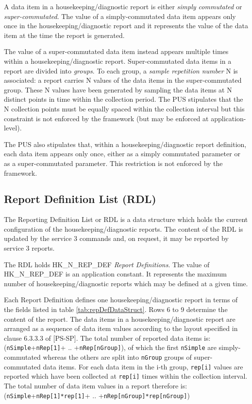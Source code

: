 \documentclass{pnp_article}
\begin{document}
A data item in a housekeeping/diagnostic report is either \textit{simply commutated} or \textit{super-commutated}. The value of a simply-commutated data item appears only once in the housekeeping/diagnostic report and it represents the value of the data item at the time the report is generated.

The value of a super-commutated data item instead appears multiple times within a housekeeping/diagnostic report. Super-commutated data items in a report are divided into \textit{groups}. To each group, a \textit{sample repetition number} N is associated: a report carries N values of the data items in the super-commutated group. These N values have been generated by sampling the data items at N distinct points in time within the collection period. The PUS stipulates that the N collection points must be equally spaced within the collection interval but this constraint is not enforced by the framework (but may be enforced at application-level). 

The PUS also stipulates that, within a housekeeping/diagnostic report definition, each data item appears only once, either as a simply commutated parameter or as a super-commutated parameter. This restriction is not enforced by the framework.

\subsection{Report Definition List (RDL)}\label{sec:serv3RDL}
The Reporting Definition List or RDL is a data structure which holds the current configuration of the housekeeping/diagnostic reports. The content of the RDL is updated by the service 3 commands and, on request, it may be reported by service 3 reports.

The RDL holds HK\_N\_REP\_DEF \textit{Report Definitions}. The value of HK\_N\_REP\_DEF is an application constant. It represents the maximum number of housekeeping/diagnostic reports which may be defined at a given time. 

Each Report Definition defines one housekeeping/diagnostic report in terms of the fields listed in table \ref{tab:repDefDataStruct}. Rows 6 to 9 determine the content of the report. The data items in a housekeeping/diagnostic report are arranged as a sequence of data item values according to the layout specified in clause 6.3.3.3 of [PS-SP]. The total number of reported data items is: (\texttt{nSimple}+\texttt{nRep[1]}+ .. +\texttt{nRep[nGroup]}), of which the first \texttt{nSimple} are simply-commutated whereas the others are split into \texttt{nGroup} groups of super-commutated data items. For each data item in the i-th group, \texttt{rep[i]} values are reported which have been collected at \texttt{rep[i]} times within the collection interval. The total number of data item values in a report therefore is: (\texttt{nSimple}+\texttt{nRep[1]*rep[1]}+ .. +\texttt{nRep[nGroup]*rep[nGroup]})
\end{document}
